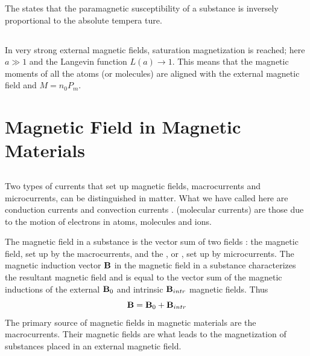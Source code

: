 The  states that the paramagnetic susceptibility of a substance is inversely proportional to the absolute tempera­ ture.

\subsection{}\label{26.3.8} In very strong external magnetic fields, saturation magnetization is reached; here $a \gg 1$ and the Langevin function $L (a) \to  1$. This means that the magnetic moments of all the atoms (or molecules) are aligned with the external magnetic field and $M = n_{0}P_{m}$.

\section{Magnetic Field in Magnetic Materials}
\label{sec-26.4} 

\subsection{}\label{26.4.1} Two types of currents that set up magnetic fields, macrocurrents and microcurrents, can be distinguished in matter. What we have called  here are conduction currents  and convection currents .  (molecular currents) are those due to the motion of electrons in atoms, molecules and ions.

The magnetic field in a substance is the vector sum of two fields : the  magnetic field, set up by the macrocurrents, and the , or , set up by microcurrents. The magnetic induction vector $\vb{B}$  in the magnetic field in a substance characterizes the resultant magnetic field and is equal to the vector sum of the magnetic inductions of the external $\vb{B}_{0}$ and intrinsic $\vb{B}_{intr}$ magnetic fields. Thus
\begin{equation*}%
\vb{B} = \vb{B}_{0} + \vb{B}_{intr}
\end{equation*}
The primary source of magnetic fields in magnetic materials are the macrocurrents. Their magnetic fields are what leads to the magnetization of substances placed in an external magnetic field.

